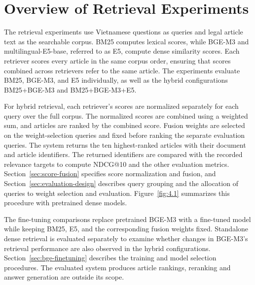 \section{Overview of Retrieval Experiments}
\label{sec:system-overview}

The retrieval experiments use Vietnamese questions as queries and legal article text as the searchable corpus. BM25 computes lexical scores, while BGE-M3 and multilingual-E5-base, referred to as E5, compute dense similarity scores. Each retriever scores every article in the same corpus order, ensuring that scores combined across retrievers refer to the same article. The experiments evaluate BM25, BGE-M3, and E5 individually, as well as the hybrid configurations BM25+BGE-M3 and BM25+BGE-M3+E5.

For hybrid retrieval, each retriever's scores are normalized separately for each query over the full corpus. The normalized scores are combined using a weighted sum, and articles are ranked by the combined score. Fusion weights are selected on the weight-selection queries and fixed before ranking the separate evaluation queries. The system returns the ten highest-ranked articles with their document and article identifiers. The returned identifiers are compared with the recorded relevance targets to compute NDCG@10 and the other evaluation metrics. Section~\ref{sec:score-fusion} specifies score normalization and fusion, and Section~\ref{sec:evaluation-design} describes query grouping and the allocation of queries to weight selection and evaluation. Figure~\ref{fig:4.1} summarizes this procedure with pretrained dense models.

The fine-tuning comparisons replace pretrained BGE-M3 with a fine-tuned model while keeping BM25, E5, and the corresponding fusion weights fixed. Standalone dense retrieval is evaluated separately to examine whether changes in BGE-M3's retrieval performance are also observed in the hybrid configurations. Section~\ref{sec:bge-finetuning} describes the training and model selection procedures. The evaluated system produces article rankings, reranking and answer generation are outside its scope.

